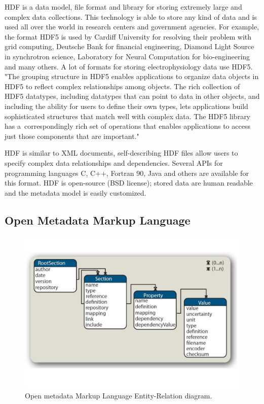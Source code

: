\documentclass[conference]{IEEEtran}
\begin{document}
HDF is a data model, file format and library for storing extremely large and complex data collections. This technology is able to store any kind of data and is used all over the world in research centers and government agencies. For example, the format HDF5 is used by Cardiff University for resolving their problem with grid computing, Deutsche Bank for financial engineering, Diamond Light Source in synchrotron science, Laboratory for Neural Computation for bio-engineering and many others. A lot of formats for storing electrophysiology data use HDF5.
"The grouping structure in HDF5 enables applications to organize data objects in HDF5 to reflect complex relationships among objects. The rich collection of HDF5 datatypes, including datatypes that can point to data in other objects, and including the ability for users to define their own types, lets applications build sophisticated structures that match well with complex data. The HDF5 library has a~correspondingly rich set of operations that enables applications to access just those components that are important." \cite{hdf}


HDF is similar to XML documents, self-describing HDF files allow users to specify complex data relationships and dependencies. Several APIs for programming languages C, C++, Fortran 90, Java and others are available for this format. HDF is open-source (BSD license); stored data are human readable and the metadata model is easily customized.

\subsection{Open Metadata Markup Language}
\label{odML}

\begin{figure}[!t]
\centering
\includegraphics[scale=0.3]{obrazky/odml_tree.pdf}
\caption{Open metadata Markup Language Entity-Relation diagram. \cite{odml}}
\label{odml-tree}
\end{figure}
	
\end{document}
